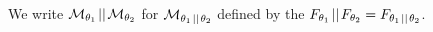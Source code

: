 \documentclass[preview]{standalone}
\begin{document}
We write $\view[\viewppty_1] \pll \view[\viewppty_2]$ for $\view[\viewppty_1 \pll \viewppty_2]$ defined by the \grpfctN $\grpfct[\viewppty_1] \pll \grpfct[\viewppty_2] = \grpfct[\viewppty_1 \pll \viewppty_2]$.
%
%
\end{document}
